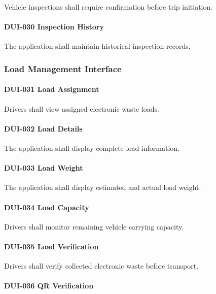 Vehicle inspections shall require confirmation before trip initiation.

\paragraph{DUI-030 Inspection History}

The application shall maintain historical inspection records.


\subsubsection*{Load Management Interface}

\paragraph{DUI-031 Load Assignment}

Drivers shall view assigned electronic waste loads.

\paragraph{DUI-032 Load Details}

The application shall display complete load information.

\paragraph{DUI-033 Load Weight}

The application shall display estimated and actual load weight.

\paragraph{DUI-034 Load Capacity}

Drivers shall monitor remaining vehicle carrying capacity.

\paragraph{DUI-035 Load Verification}

Drivers shall verify collected electronic waste before transport.

\paragraph{DUI-036 QR Verification}

